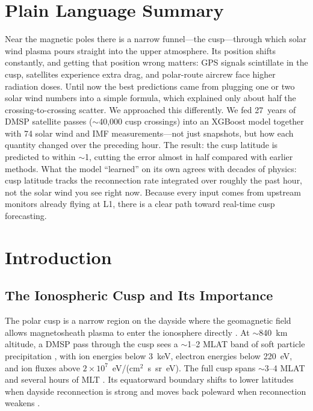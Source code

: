 \documentclass[draft]{agujournal2019}
\begin{document}
\section*{Plain Language Summary}
Near the magnetic poles there is a narrow funnel---the cusp---through which solar wind plasma pours straight into the upper atmosphere. Its position shifts constantly, and getting that position wrong matters: GPS signals scintillate in the cusp, satellites experience extra drag, and polar-route aircrew face higher radiation doses. Until now the best predictions came from plugging one or two solar wind numbers into a simple formula, which explained only about half the crossing-to-crossing scatter. We approached this differently. We fed 27~years of DMSP satellite passes ($\sim$40{,}000 cusp crossings) into an XGBoost model together with 74 solar wind and IMF measurements---not just snapshots, but how each quantity changed over the preceding hour. The result: the cusp latitude is predicted to within $\sim$1\textdegree, cutting the error almost in half compared with earlier methods. What the model ``learned'' on its own agrees with decades of physics: cusp latitude tracks the reconnection rate integrated over roughly the past hour, not the solar wind you see right now. Because every input comes from upstream monitors already flying at L1, there is a clear path toward real-time cusp forecasting.

\section{Introduction}
\label{sec:intro}

\subsection{The Ionospheric Cusp and Its Importance}

The polar cusp is a narrow region on the dayside where the geomagnetic field allows magnetosheath plasma to enter the ionosphere directly \cite{pitout2021cluster}. At $\sim$840~km altitude, a DMSP pass through the cusp sees a $\sim$1--2\textdegree{} MLAT band of soft particle precipitation \cite{newell1988cusp}, with ion energies below 3~keV, electron energies below 220~eV, and ion fluxes above $2 \times 10^7$~eV/(cm$^2$~s~sr~eV). The full cusp spans $\sim$3--4\textdegree{} MLAT and several hours of MLT \cite{zhang2013lfm, wing2005kp}. Its equatorward boundary shifts to lower latitudes when dayside reconnection is strong and moves back poleward when reconnection weakens \cite{newell2006cusp, newell2007coupling}.
\end{document}
